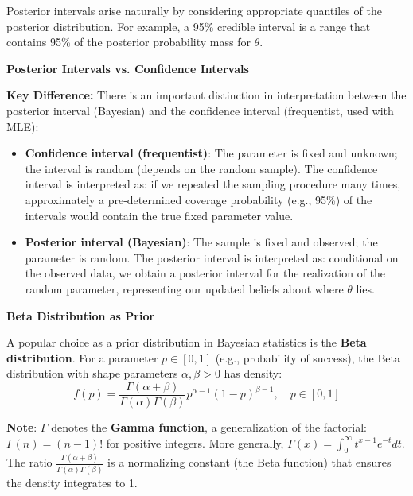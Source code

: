 \documentclass[12pt,a4paper]{article}
\begin{document}
Posterior intervals arise naturally by considering appropriate quantiles of the posterior distribution. For example, a 95\% credible interval is a range that contains 95\% of the posterior probability mass for $\theta$.

\vspace{0.5em}

\textbf{Posterior Intervals vs. Confidence Intervals}

\textbf{Key Difference:} There is an important distinction in interpretation between the posterior interval (Bayesian) and the confidence interval (frequentist, used with MLE):

\begin{itemize}
    \item \textbf{Confidence interval (frequentist)}: The parameter is fixed and unknown; the interval is random (depends on the random sample). The confidence interval is interpreted as: if we repeated the sampling procedure many times, approximately a pre-determined coverage probability (e.g., 95\%) of the intervals would contain the true fixed parameter value.
    
    \item \textbf{Posterior interval (Bayesian)}: The sample is fixed and observed; the parameter is random. The posterior interval is interpreted as: conditional on the observed data, we obtain a posterior interval for the realization of the random parameter, representing our updated beliefs about where $\theta$ lies.
\end{itemize}

\vspace{0.5em}

\textbf{Beta Distribution as Prior}

A popular choice as a prior distribution in Bayesian statistics is the \textbf{Beta distribution}. For a parameter $p \in [0, 1]$ (e.g., probability of success), the Beta distribution with shape parameters $\alpha, \beta > 0$ has density:
\[
f(p) = \frac{\Gamma(\alpha + \beta)}{\Gamma(\alpha) \Gamma(\beta)} p^{\alpha-1} (1-p)^{\beta-1}, \quad p \in [0, 1]
\]

\textbf{Note}: $\Gamma$ denotes the \textbf{Gamma function}, a generalization of the factorial: $\Gamma(n) = (n-1)!$ for positive integers. More generally, $\Gamma(x) = \int_0^{\infty} t^{x-1} e^{-t} dt$. The ratio $\frac{\Gamma(\alpha + \beta)}{\Gamma(\alpha) \Gamma(\beta)}$ is a normalizing constant (the Beta function) that ensures the density integrates to 1.
\end{document}
